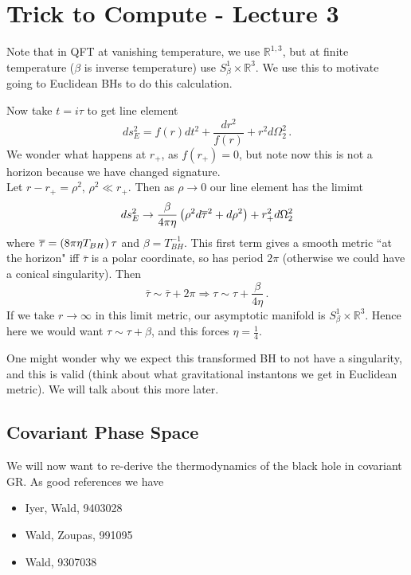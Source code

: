 \documentclass{article}
\begin{document}
\section{Trick to Compute  - Lecture 3}

\begin{remark}
	Note that in QFT at vanishing temperature, we use $\mathbb{R}^{1,3}$, but at finite temperature ($\beta$ is inverse temperature) use $S_\beta^1 \times \mathbb{R}^3$. We use this to motivate going to Euclidean BHs to do this calculation. 
\end{remark}

Now take $t=i\tau$ to get line element 
\[
ds_E^2 = f(r) dt^2 + \frac{dr^2}{f(r)} + r^2 d\Omega _2^2 \, . 
\]
We wonder what happens at $r_+$, as $f(r_+)=0$, but note now this is not a horizon because we have changed signature. \\
Let $r-r_+ = \rho^2, \, \rho^2 \ll r_+$. Then as $\rho \to 0$ our line element has the limimt 
\[
ds_E^2 \to \frac{\beta}{4 \pi \eta} \left( \rho^2 d\overline{\tau}^2 + d \rho^2 \right) + r_+^2 d\Omega_2^2 
\]
where $\overline{\tau} = \left( 8 \pi \eta T_{BH} \right) \tau$ and $\beta = T_{BH}^{-1}$. This first term gives a smooth metric ``at the horizon" iff $\bar{\tau}$ is a polar coordinate, so has period $2\pi$ (otherwise we could have a conical singularity). Then 
\[
\bar{\tau} \sim \bar{\tau}+2 \pi \Rightarrow \tau \sim \tau + \frac{\beta}{4 \eta} \, .
\] 
If we take $r \to \infty$ in this limit metric, our asymptotic manifold is $S_\beta^1 \times \mathbb{R}^3$. Hence here we would want $\tau \sim \tau +\beta$, and this forces $\eta = \frac{1}{4}$. 
\begin{remark}
	One might wonder why we expect this transformed BH to not have a singularity, and this is valid (think about what gravitational instantons we get in Euclidean metric). We will talk about this more later.  
\end{remark}

\subsection{Covariant Phase Space}
We will now want to re-derive the thermodynamics of the black hole in covariant GR. As good references we have 
\begin{itemize}
	\item Iyer, Wald, 9403028
	\item Wald, Zoupas, 991095
	\item Wald, 9307038
\end{itemize}
\end{document}
